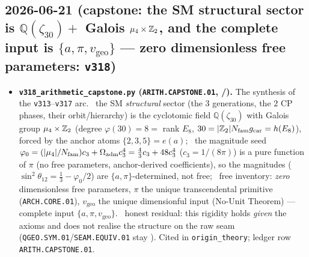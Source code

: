 \subsection*{2026-06-21 (capstone: the SM structural sector is $\mathbb Q(\zeta_{30})+$ Galois $\mu_4\times\mathbb{Z}_2$, and the complete input is $\{a,\pi,v_{\mathrm{geo}}\}$ --- zero dimensionless free parameters: \texttt{v318})}
\begin{itemize}
\item \textbf{\texttt{v318\_arithmetic\_capstone.py} (\texttt{ARITH.CAPSTONE.01}, \mE/\mO).} The synthesis of the
  \texttt{v313}--\texttt{v317} arc. \mE\ the SM \emph{structural} sector (the $3$ generations, the $2$ CP phases,
  their orbit/hierarchy) is the cyclotomic field $\mathbb Q(\zeta_{30})$ with Galois group $\mu_4\times\mathbb{Z}_2$ (degree
  $\varphi(30)=8=$ rank $E_8$, $30=|\mathbb{Z}_2|N_{\mathrm{fam}}g_{\mathrm{car}}=h(E_8)$), forced by the anchor atoms $\{2,3,5\}=e(a)$; \mE\ the
  magnitude seed $\varphi_0=(|\mu_4|/N_{\mathrm{fam}})c_3+\Omega_{\mathrm{adm}}c_3^4=\tfrac43 c_3+48 c_3^4$ ($c_3=1/(8\pi)$) is a
  pure function of $\pi$ (no free parameters, anchor-derived coefficients), so the magnitudes
  ($\sin^2\theta_{12}=\tfrac13-\varphi_0/2$) are $\{a,\pi\}$-determined, not free; \mE\ free inventory: \emph{zero}
  dimensionless free parameters, $\pi$ the unique transcendental primitive (\texttt{ARCH.CORE.01}), $v_{\mathrm{geo}}$
  the unique dimensionful input (No-Unit Theorem) --- complete input $\{a,\pi,v_{\mathrm{geo}}\}$. \mO\ honest
  residual: this rigidity holds \emph{given} the axioms and does not realise the structure on the raw seam
  (\texttt{QGEO.SYM.01}/\texttt{SEAM.EQUIV.01} stay \mO). Cited in \texttt{origin\_theory}; ledger row
  \texttt{ARITH.CAPSTONE.01}.
\end{itemize}

